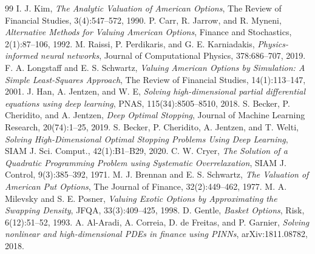 \documentclass[11pt,a4paper]{article}
\begin{document}
\begin{thebibliography}{99}
 I. J. Kim, \emph{The Analytic Valuation of American Options}, The Review of Financial Studies, 3(4):547--572, 1990.
 P. Carr, R. Jarrow, and R. Myneni, \emph{Alternative Methods for Valuing American Options}, Finance and Stochastics, 2(1):87--106, 1992.
 M. Raissi, P. Perdikaris, and G. E. Karniadakis, \emph{Physics-informed neural networks}, Journal of Computational Physics, 378:686--707, 2019.
 F. A. Longstaff and E. S. Schwartz, \emph{Valuing American Options by Simulation: A Simple Least-Squares Approach}, The Review of Financial Studies, 14(1):113--147, 2001.
 J. Han, A. Jentzen, and W. E, \emph{Solving high-dimensional partial differential equations using deep learning}, PNAS, 115(34):8505--8510, 2018.
 S. Becker, P. Cheridito, and A. Jentzen, \emph{Deep Optimal Stopping}, Journal of Machine Learning Research, 20(74):1--25, 2019.
 S. Becker, P. Cheridito, A. Jentzen, and T. Welti, \emph{Solving High-Dimensional Optimal Stopping Problems Using Deep Learning}, SIAM J. Sci. Comput., 42(1):B1--B29, 2020.
 C. W. Cryer, \emph{The Solution of a Quadratic Programming Problem using Systematic Overrelaxation}, SIAM J. Control, 9(3):385--392, 1971.
 M. J. Brennan and E. S. Schwartz, \emph{The Valuation of American Put Options}, The Journal of Finance, 32(2):449--462, 1977.
 M. A. Milevsky and S. E. Posner, \emph{Valuing Exotic Options by Approximating the Swapping Density}, JFQA, 33(3):409--425, 1998.
 D. Gentle, \emph{Basket Options}, Risk, 6(12):51--52, 1993.
 A. Al-Aradi, A. Correia, D. de Freitas, and P. Garnier, \emph{Solving nonlinear and high-dimensional PDEs in finance using PINNs}, arXiv:1811.08782, 2018.
\end{thebibliography}
\end{document}
